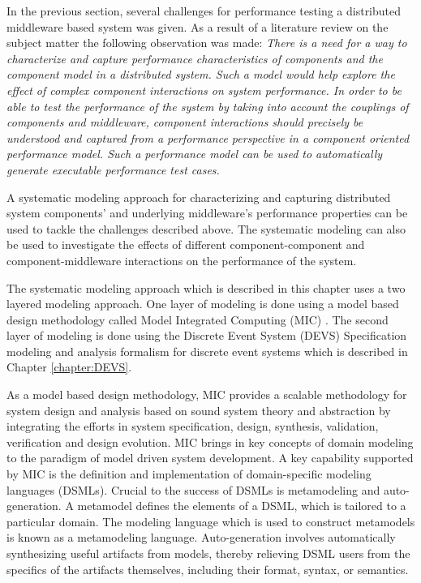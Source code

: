 In the previous section, several challenges for performance testing a distributed middleware based system was given. As a result of a literature review on the subject matter \cite{areapaper} the following observation was made: \textit{There is a need for a way to characterize and capture performance characteristics of components and the component model in a distributed system. Such a model would help explore the effect of complex component interactions on system performance. In order to be able to test the performance of the system by taking into account the couplings of components and middleware, component interactions should precisely be understood and captured from a performance perspective in a component oriented performance model. Such a performance model can be used to automatically generate executable performance test cases.} 

A systematic modeling approach for characterizing and capturing distributed system components' and underlying middleware's performance properties can be used to tackle the challenges described above. The systematic modeling can also be used to investigate the effects of different component-component and component-middleware interactions on the performance of the system. 

The systematic modeling approach which is described in this chapter uses a two layered modeling approach. One layer of modeling is done using a model based design methodology called Model Integrated Computing (MIC) \cite{Greenfield2004Software, MIC}. The second layer of modeling is done using the Discrete Event System (DEVS) Specification modeling and analysis formalism for discrete event systems which is described in Chapter \ref{chapter:DEVS}. 

As a model based design methodology, MIC provides a scalable methodology for system design and analysis based on sound system theory and abstraction by integrating the efforts in system specification, design, synthesis, validation, verification and design evolution. MIC brings in key concepts of domain modeling to the paradigm of model driven system development. A key capability supported by MIC is the definition and implementation of domain-specific modeling languages (DSMLs). Crucial to the success of DSMLs is metamodeling and auto-generation. A metamodel defines the elements of a DSML, which is tailored to a particular domain. The modeling language which is used to construct metamodels is known as a metamodeling language. Auto-generation involves automatically synthesizing useful artifacts from models, thereby relieving DSML users from the specifics of the artifacts themselves, including their format, syntax, or semantics.

